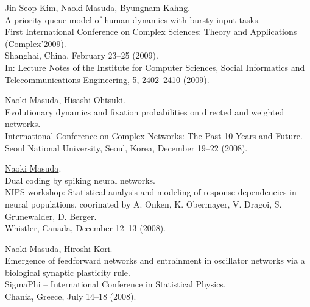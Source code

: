 \documentclass[11pt,letter]{article}
\begin{document}
\begin{etaremune}

\item Jin Seop Kim, \underline{Naoki Masuda}, Byungnam Kahng.\\
A priority queue model of human dynamics with bursty input tasks.\\
First International Conference on Complex Sciences: Theory and Applications (Complex'2009).\\
Shanghai, China, February 23--25 (2009).\\
In: Lecture Notes of the Institute for Computer Sciences, Social Informatics and Telecommunications Engineering, 5, 2402--2410 (2009).

\item \underline{Naoki Masuda}, Hisashi Ohtsuki.\\
Evolutionary dynamics and fixation probabilities on directed and weighted networks.\\
International Conference on Complex Networks: The Past 10 Years and Future.\\
Seoul National University, Seoul, Korea, December 19--22 (2008).

\item \underline{Naoki Masuda}.\\
Dual coding by spiking neural networks.\\
NIPS workshop: Statistical analysis and modeling of response dependencies in neural populations, coorinated by A. Onken, K. Obermayer, V. Dragoi, S. Grunewalder, D. Berger.\\
Whistler, Canada, December 12--13 (2008).

\item \underline{Naoki Masuda}, Hiroshi Kori.\\
Emergence of feedforward networks and entrainment in oscillator networks via a biological synaptic plasticity rule.\\
SigmaPhi -- International Conference in Statistical Physics.\\
Chania, Greece, July 14--18 (2008).


\end{etaremune}
\end{document}
